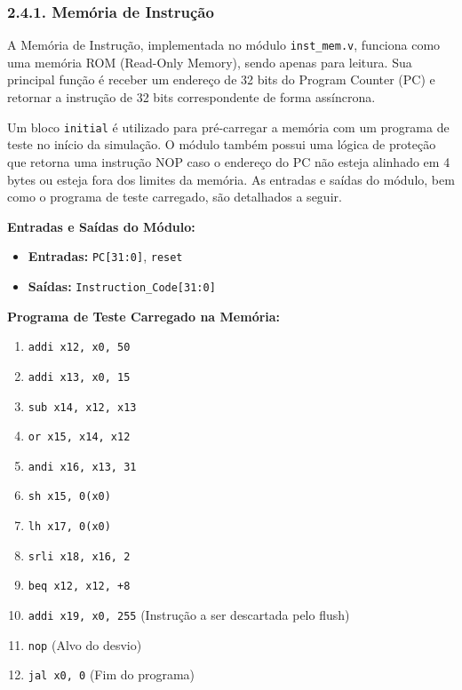 \documentclass[12pt, a4paper]{article}
\begin{document}
\subsubsection*{2.4.1. Memória de Instrução}

A Memória de Instrução, implementada no módulo \texttt{inst\_mem.v}, funciona como uma memória ROM (Read-Only Memory), sendo apenas para leitura. Sua principal função é receber um endereço de 32 bits do Program Counter (PC) e retornar a instrução de 32 bits correspondente de forma assíncrona.

Um bloco \texttt{initial} é utilizado para pré-carregar a memória com um programa de teste no início da simulação. O módulo também possui uma lógica de proteção que retorna uma instrução NOP caso o endereço do PC não esteja alinhado em 4 bytes ou esteja fora dos limites da memória. As entradas e saídas do módulo, bem como o programa de teste carregado, são detalhados a seguir.

\vspace{0.5cm}
\textbf{Entradas e Saídas do Módulo:}
\begin{itemize}
    \item \textbf{Entradas:} \texttt{PC[31:0]}, \texttt{reset}
    \item \textbf{Saídas:} \texttt{Instruction\_Code[31:0]}
\end{itemize}

\textbf{Programa de Teste Carregado na Memória:}
\begin{enumerate}
    \item \texttt{addi x12, x0, 50}
    \item \texttt{addi x13, x0, 15}
    \item \texttt{sub  x14, x12, x13}
    \item \texttt{or   x15, x14, x12}
    \item \texttt{andi x16, x13, 31}
    \item \texttt{sh   x15, 0(x0)}
    \item \texttt{lh   x17, 0(x0)}
    \item \texttt{srli x18, x16, 2}
    \item \texttt{beq  x12, x12, +8}
    \item \texttt{addi x19, x0, 255} (Instrução a ser descartada pelo flush)
    \item \texttt{nop} (Alvo do desvio)
    \item \texttt{jal x0, 0} (Fim do programa)
\end{enumerate}
\end{document}
